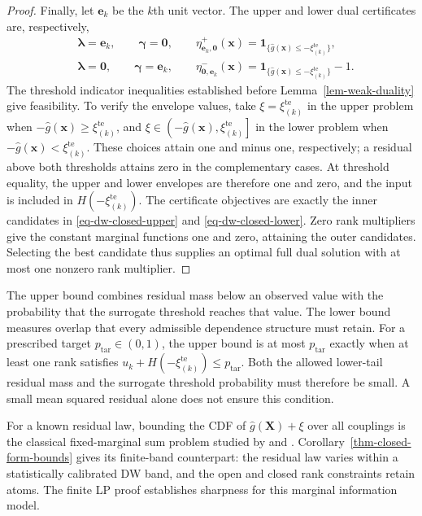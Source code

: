 \documentclass[review,11pt,3p,authoryear,nopreprintline]{elsarticle}
\begin{document}
\begin{proof}
  Finally, let $\bm e_k$ be the $k$th unit vector. The upper and lower dual certificates are, respectively,
  \begin{align*}
    &\bm\lambda=\bm e_k,\qquad \bm\gamma=\bm 0,\qquad
      \eta^+_{\bm e_k,\bm 0}(\bm x)
      =\mathbf1_{\{\hat g(\bm x)\le-\xi_{(k)}^{\mathrm{te}}\}},\\
    &\bm\lambda=\bm 0,\qquad \bm\gamma=\bm e_k,\qquad
      \eta^-_{\bm 0,\bm e_k}(\bm x)
      =\mathbf1_{\{\hat g(\bm x)\le-\xi_{(k)}^{\mathrm{te}}\}}-1.
  \end{align*}
  The threshold indicator inequalities established before Lemma~\ref{lem-weak-duality} give feasibility. To verify the envelope values, take $\xi=\xi_{(k)}^{\mathrm{te}}$ in the upper problem when $-\hat g(\bm x)\ge\xi_{(k)}^{\mathrm{te}}$, and $\xi\in\left(-\hat g(\bm x),\xi_{(k)}^{\mathrm{te}}\right]$ in the lower problem when $-\hat g(\bm x)<\xi_{(k)}^{\mathrm{te}}$. These choices attain one and minus one, respectively; a residual above both thresholds attains zero in the complementary cases. At threshold equality, the upper and lower envelopes are therefore one and zero, and the input is included in $H\left(-\xi_{(k)}^{\mathrm{te}}\right)$. The certificate objectives are exactly the inner candidates in \eqref{eq-dw-closed-upper} and \eqref{eq-dw-closed-lower}. Zero rank multipliers give the constant marginal functions one and zero, attaining the outer candidates. Selecting the best candidate thus supplies an optimal full dual solution with at most one nonzero rank multiplier.
\end{proof}

The upper bound combines residual mass below an observed value with the probability that the surrogate threshold reaches that value. The lower bound measures overlap that every admissible dependence structure must retain. For a prescribed target $p_{\mathrm{tar}}\in(0,1)$, the upper bound is at most $p_{\mathrm{tar}}$ exactly when at least one rank satisfies $u_k+H\left(-\xi_{(k)}^{\mathrm{te}}\right)\le p_{\mathrm{tar}}$. Both the allowed lower-tail residual mass and the surrogate threshold probability must therefore be small. A small mean squared residual alone does not ensure this condition.

For a known residual law, bounding the CDF of $\hat g(\bm X)+\xi$ over all couplings is the classical fixed-marginal sum problem studied by \citet{M82} and \citet{F.N.S87}. Corollary~\ref{thm-closed-form-bounds} gives its finite-band counterpart: the residual law varies within a statistically calibrated DW band, and the open and closed rank constraints retain atoms. The finite LP proof establishes sharpness for this marginal information model.
\end{document}
